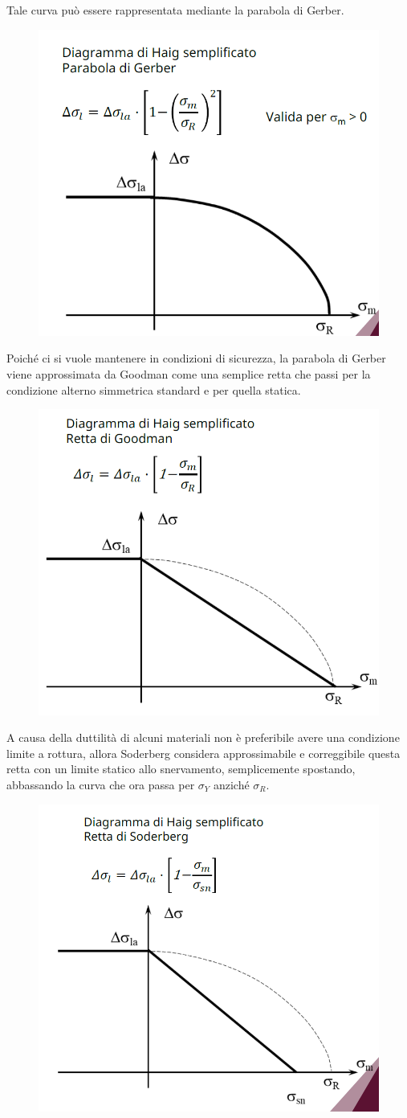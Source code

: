			Tale curva può essere rappresentata mediante la parabola di Gerber.
			\begin{figure}[H]
				\centering
				\includegraphics[width=0.5\linewidth]{immagini_11/screenshot004}
				\label{fig:screenshot004}
			\end{figure}			 
			Poiché ci si vuole mantenere in condizioni di sicurezza, la parabola di Gerber viene approssimata da Goodman come una semplice retta che passi per la condizione alterno simmetrica standard e per quella statica. 
			\begin{figure}[H]
				\centering
				\includegraphics[width=0.5\linewidth]{immagini_11/screenshot005}
				\label{fig:screenshot005}
			\end{figure}						
			A causa della duttilità di alcuni materiali non è preferibile avere una condizione limite a rottura, allora Soderberg considera approssimabile e correggibile questa retta con un limite statico allo snervamento, semplicemente spostando, abbassando la curva che ora passa per $\sigma_Y$ anziché $\sigma_R$.
			\begin{figure}[H]
				\centering
				\includegraphics[width=0.5\linewidth]{immagini_11/screenshot006}
				\label{fig:screenshot006}
			\end{figure}
